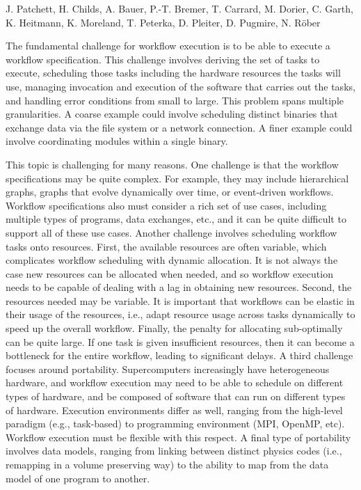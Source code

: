 \license

 J. Patchett, H. Childs, A. Bauer, P.-T. Bremer, T. Carrard, M. Dorier, C. Garth, K. Heitmann, K. Moreland, T. Peterka, D. Pleiter, D. Pugmire, N. Röber

\begin{refsection}

The fundamental challenge for workflow execution is to be able to execute a workflow specification.  This challenge involves deriving the set of tasks to execute, scheduling those tasks including the hardware resources the tasks will use, managing invocation and execution of the software that carries out the tasks, and handling error conditions from small to large.
This problem spans multiple granularities.  A coarse example could involve scheduling distinct binaries that exchange data via the file system or a network connection.  A finer example could involve coordinating modules within a single binary.

This topic is challenging for many reasons.
One challenge is that the workflow specifications may be quite complex.  For example, they may include hierarchical graphs, graphs that evolve dynamically over time, or event-driven workflows.  Workflow specifications also must consider a rich set of use cases, including multiple types of programs, data exchanges, etc., and it can be quite difficult to support all of these use cases.
Another challenge involves scheduling workflow tasks onto resources.  First, the available resources are often variable, which complicates workflow scheduling with dynamic allocation.  It is not always the case new resources can be allocated when needed, and so workflow execution needs to be capable of dealing with a lag in obtaining new resources.  Second, the resources needed may be variable.  It is important that workflows can be elastic in their usage of the resources, i.e., adapt resource usage across tasks dynamically to speed up the overall workflow.  Finally, the penalty for allocating sub-optimally can be quite large.  If one task is given insufficient resources, then it can become a bottleneck for the entire workflow, leading to significant delays.
A third challenge focuses around portability.  Supercomputers increasingly have heterogeneous hardware, and workflow execution may need to be able to schedule on different types of hardware, and be composed of software that can run on different types of hardware.  Execution environments differ as well, ranging from the high-level paradigm (e.g., task-based) to programming environment (MPI, OpenMP, etc).  Workflow execution must be flexible with this respect.  A final type of portability involves data models, ranging from linking between distinct physics codes (i.e., remapping in a volume preserving way) to the ability to map from the data model of one program to another.


\end{refsection}
